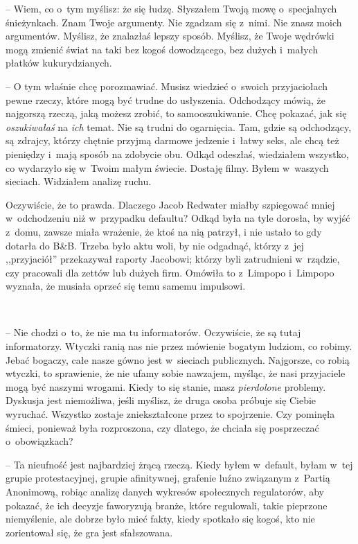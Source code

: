 \documentclass[oneside,polish,11pt,sfheadings]{mwbk}
\begin{document}
-- Wiem, co o~tym myślisz: że się łudzę. Słyszałem Twoją mowę o~specjalnych śnieżynkach. Znam Twoje argumenty. Nie zgadzam się z~nimi.
Nie znasz moich argumentów. Myślisz, że znalazłaś lepszy sposób.
Myślisz, że Twoje wędrówki mogą zmienić świat na taki bez kogoś
dowodzącego, bez dużych i~małych płatków kukurydzianych.

-- O tym właśnie chcę porozmawiać. Musisz wiedzieć o~swoich przyjaciołach
pewne rzeczy, które mogą być trudne do usłyszenia. Odchodzący mówią, że
najgorszą rzeczą, jaką możesz zrobić, to samooszukiwanie. Chcę pokazać,
jak się \textit{oszukiwałaś} na \textit{ich} temat. Nie są trudni do
ogarnięcia. Tam, gdzie są odchodzący, są zdrajcy, którzy chętnie przyjmą
darmowe jedzenie i~łatwy seks, ale chcą też pieniędzy i~mają sposób na
zdobycie obu. Odkąd odeszłaś, wiedziałem wszystko, co wydarzyło się w~Twoim małym świecie. Dostaję filmy. Byłem w~waszych sieciach. Widziałem
analizę ruchu.

Oczywiście, że to prawda. Dlaczego Jacob Redwater miałby szpiegować
mniej w~odchodzeniu niż w~przypadku defaultu? Odkąd była na tyle
dorosła, by wyjść z~domu, zawsze miała wrażenie, że ktoś na nią patrzył,
i nie ustało to gdy dotarła do B\&B. Trzeba było aktu woli, by nie
odgadnąć, którzy z~jej ,,przyjaciół'' przekazywał raporty Jacobowi;
którzy byli zatrudnieni w~rządzie, czy pracowali dla zettów lub dużych
firm. Omówiła to z~Limpopo i~Limpopo wyznała, że musiała oprzeć się temu
samemu impulsowi.

~

-- Nie chodzi o~to, że nie ma tu informatorów. Oczywiście, że są tutaj
informatorzy. Wtyczki ranią nas nie przez mówienie bogatym ludziom, co
robimy. Jebać bogaczy, całe nasze gówno jest w~sieciach publicznych.
Najgorsze, co robią wtyczki, to sprawienie, że nie ufamy sobie nawzajem,
myśląc, że nasi przyjaciele mogą być naszymi wrogami. Kiedy to się
stanie, masz \textit{pierdolone} problemy. Dyskusja jest niemożliwa, jeśli
myślisz, że druga osoba próbuje się Ciebie wyruchać. Wszystko zostaje
zniekształcone przez to spojrzenie. Czy pominęła śmieci, ponieważ była
rozproszona, czy dlatego, że chciała się posprzeczać o~obowiązkach?

-- Ta nieufność jest najbardziej żrącą rzeczą. Kiedy byłem w~default,
byłam w~tej grupie protestacyjnej, grupie afinitywnej, grafenie luźno
związanym z~Partią Anonimową, robiąc analizę danych wykresów społecznych
regulatorów, aby pokazać, że ich decyzje faworyzują branże, które
regulowali, takie pieprzone niemyślenie, ale dobrze było mieć fakty,
kiedy spotkało się kogoś, kto nie zorientował się, że gra jest
sfałszowana.
\end{document}
